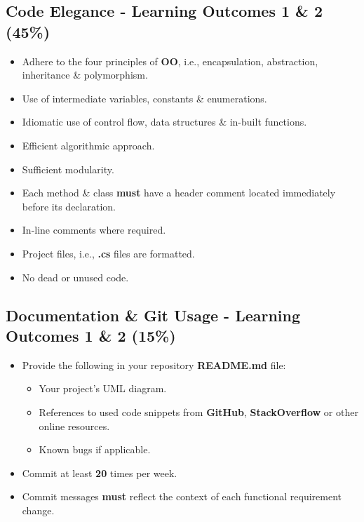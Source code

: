 \documentclass{article}
\begin{document}
\subsection*{Code Elegance - Learning Outcomes 1 \& 2  (45\%)}
\begin{itemize}
    \item Adhere to the four principles of \textbf{OO}, i.e., encapsulation, abstraction, inheritance \& polymorphism.
    \item Use of intermediate variables, constants \& enumerations.
    \item Idiomatic use of control flow, data structures \& in-built functions.
    \item Efficient algorithmic approach.
    \item Sufficient modularity.
    \item Each method \& class \textbf{must} have a header comment located immediately before its declaration.
    \item In-line comments where required. 
    \item Project files, i.e., \textbf{.cs} files are formatted. 
    \item No dead or unused code.
\end{itemize}

\subsection*{Documentation \& Git Usage - Learning Outcomes 1 \& 2 (15\%)}
\begin{itemize}
    \item Provide the following in your repository \textbf{README.md} file:
    \begin{itemize}
        \item Your project's UML diagram.
        \item References to used code snippets from \textbf{GitHub}, \textbf{StackOverflow} or other online resources.
        \item Known bugs if applicable.
    \end{itemize}
    \item Commit at least \textbf{20} times per week.
    \item Commit messages \textbf{must} reflect the context of each functional requirement change.
\end{itemize}
\end{document}
